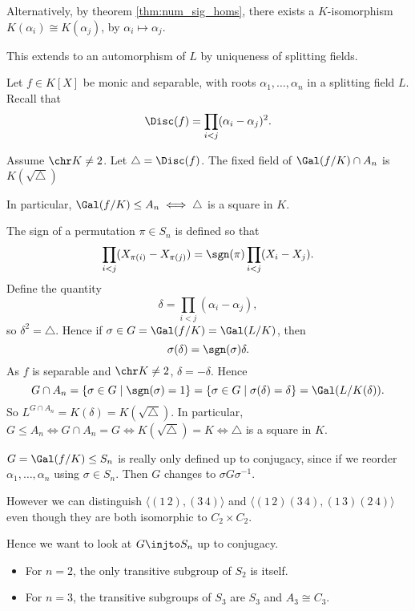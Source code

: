 \documentclass[12pt]{article}
\begin{document}
\begin{remark}
	Alternatively, by theorem \ref{thm:num_sig_homs}, there exists a $K$-isomorphism $K(\alpha_i) \cong K(\alpha_j)$, by $\alpha_i \mapsto \alpha_j$.

	This extends to an automorphism of $L$ by uniqueness of splitting fields.
\end{remark}

Let $f \in K[X]$ be monic and separable, with roots $\alpha_1, \ldots, \alpha_n$ in a splitting field $L$. Recall that
\[
\Disc(f) = \prod_{i < j} (\alpha_i - \alpha_j)^{2}.
\]

\begin{lemma}
	Assume $\chr K \neq 2$. Let $\triangle = \Disc(f)$. The fixed field of $\Gal(f/K) \cap A_n$ is $K(\sqrt{\triangle})$

	In particular, $\Gal(f/K) \leq A_n \iff \triangle$ is a square in $K$.
\end{lemma}

\begin{proofbox}
	The sign of a permutation $\pi \in S_n$ is defined so that
	\[
	\prod_{i < j}(X_{\pi(i)} - X_{\pi(j)}) = \sgn(\pi) \prod_{i < j}(X_i - X_j).
	\] 
	Define the quantity
	\[
	\delta = \prod_{i < j}(\alpha_i - \alpha_j),
	\]
	so $\delta^2 = \triangle$. Hence if $\sigma \in G = \Gal(f/K) = \Gal(L/K)$, then
	\[
	\sigma(\delta) = \sgn(\sigma) \delta.
	\]
	As $f$ is separable and $\chr K \neq 2$, $\delta = - \delta$. Hence
	\[
		G \cap A_n = \{\sigma \in G \mid \sgn(\sigma) = 1\} = \{\sigma \in G \mid \sigma(\delta) = \delta\} = \Gal(L/K(\delta)).
	\]
	So $L^{G\cap A_n} = K(\delta) = K(\sqrt{\triangle})$. In particular, $G \leq A_n \iff G \cap A_n = G \iff K(\sqrt{\triangle}) = K \iff \triangle$ is a square in $K$.
\end{proofbox}

\begin{remark}
	$G = \Gal(f/K) \leq S_n$ is really only defined up to conjugacy, since if we reorder $\alpha_1, \ldots, \alpha_n$ using $\sigma \in S_n$. Then $G$ changes to $\sigma G \sigma^{-1}$.

	However we can distinguish $\langle(1\, 2), (3\, 4)\rangle$ and $\langle(1\, 2)(3\, 4), (1\, 3)(2\, 4)\rangle$ even though they are both isomorphic to $C_2 \times C_2$.
\end{remark}

Hence we want to look at $G \injto S_n$ up to conjugacy.
\begin{itemize}
	\item For $n = 2$, the only transitive subgroup of $S_2$ is itself.
	\item For $n = 3$, the transitive subgroups of $S_3$ are $S_3$ and $A_3 \cong C_3$.
\end{itemize}
\end{document}
